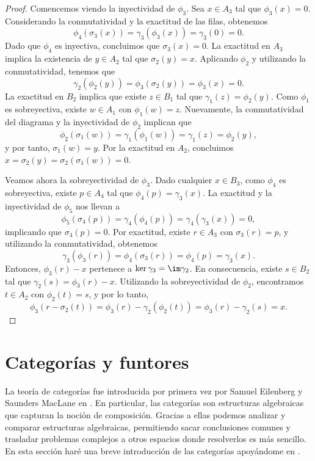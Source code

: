 \begin{proof}
	Comencemos viendo la inyectividad de \(\phi_{3}\). Sea \(x \in A_{3}\) tal que
	\(\phi_{3}(x) = 0\). Considerando la conmutatividad y la exactitud de las filas,
	obtenemos
	\[
		\phi_{4}(\sigma_{3}(x)) = \gamma_{3}(\phi_{3}(x)) = \gamma_{3}(0) = 0.
	\]
	Dado que \(\phi_{4}\) es inyectiva, concluimos que \(\sigma_{3}(x) = 0\). La
	exactitud en \(A_{3}\) implica la existencia de \(y \in A_{2}\) tal que
	\(\sigma_{2}(y) = x\). Aplicando \(\phi_{2}\) y utilizando la conmutatividad,
	tenemos que
	\[
		\gamma_{2}(\phi_{2}(y)) = \phi_{3}(\sigma_{2}(y)) = \phi_{3}(x) = 0.
	\]
	La exactitud en \(B_{2}\) implica que existe \(z \in B_{1}\) tal que
	\(\gamma_{1}(z) = \phi_{2}(y)\). Como \(\phi_{1}\) es sobreyectiva, existe
	\(w \in A_{1}\) con \(\phi_{1}(w) = z\). Nuevamente, la conmutatividad del
	diagrama y la inyectividad de \(\phi_{2}\) implican que
	\[
		\phi_{2}(\sigma_{1}(w)) = \gamma_{1}(\phi_{1}(w)) = \gamma_{1}(z) = \phi_{2}(
		y),
	\]
	y por tanto, \(\sigma_{1}(w) = y\). Por la exactitud en \(A_{2}\), concluimos \(x =
	\sigma_{2}(y) = \sigma_{2}(\sigma_{1}(w)) = 0\).

	Veamos ahora la sobreyectividad de \(\phi_{3}\). Dado cualquier \(x \in B_{3}\), como
	\(\phi_{4}\) es sobreyectiva, existe \(p \in A_{4}\) tal que
	\(\phi_{4}(p) = \gamma_{3}(x)\). La exactitud y la inyectividad de \(\phi_{5}\) nos
	llevan a
	\[
		\phi_{5}(\sigma_{4}(p)) = \gamma_{4}(\phi_{4}(p)) = \gamma_{4}(\gamma_{3}(x))
		= 0,
	\]
	implicando que \(\sigma_{4}(p) = 0\). Por exactitud, existe \(r \in A_{3}\) con \(\sigma
	_{3}(r) = p\), y utilizando la conmutatividad, obtenemos
	\[
		\gamma_{3}(\phi_{3}(r)) = \phi_{4}(\sigma_{3}(r)) = \phi_{4}(p) = \gamma_{3}(
		x).
	\]
	Entonces, \(\phi_{3}(r) - x\) pertenece a \(\ker \gamma_{3} = \im \gamma_{2}\). En
	consecuencia, existe \(s \in B_{2}\) tal que \(\gamma_{2}(s) = \phi_{3}(r) - x\). Utilizando
	la sobreyectividad de \(\phi_{2}\), encontramos \(t \in A_{2}\) con
	\(\phi_{2}(t) = s\), y por lo tanto,
	\[
		\phi_{3}(r - \sigma_{2}(t)) = \phi_{3}(r) - \gamma_{2}(\phi_{2}(t)) = \phi_{3}
		(r) - \gamma_{2}(s) = x.
	\]
\end{proof}

\section{Categorías y funtores}
\label{sec:cat}

La teoría de categorías fue introducida por primera vez por Samuel Eilenberg y Saunders
MacLane en \cite{eilenberg1945general}. En particular, las categorías son estructuras
algebraicas que capturan la noción de composición. Gracias a ellas podemos
analizar y comparar estructuras algebraicas, permitiendo sacar conclusiones comunes
y trasladar problemas complejos a otros espacios donde resolverlos es más sencillo.
En esta sección haré una breve introducción de las categorías apoyándome en
\cite{mac2013categories}.


